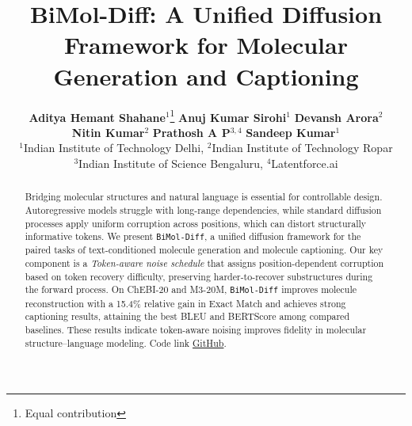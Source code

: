\documentclass[11pt]{article}
\title{BiMol-Diff: A Unified Diffusion Framework for Molecular Generation and Captioning}
\author{
\textbf{Aditya Hemant Shahane}$^{1}$\thanks{Equal contribution} \quad
\textbf{Anuj Kumar Sirohi}$^{1}$\footnotemark[1] \quad
\textbf{Devansh Arora}$^{2}$ \\
\textbf{Nitin Kumar}$^{2}$ \quad
\textbf{Prathosh A P}$^{3,4}$ \quad
\textbf{Sandeep Kumar}$^{1}$ \\
$^{1}$Indian Institute of Technology Delhi, 
$^{2}$Indian Institute of Technology Ropar \\
$^{3}$Indian Institute of Science Bengaluru, 
$^{4}$Latentforce.ai
}
\begin{document}
\maketitle
\begin{abstract}

Bridging molecular structures and natural language is essential for controllable design. Autoregressive models struggle with long-range dependencies, while standard diffusion processes apply uniform corruption across positions, which can distort structurally informative tokens. We present \texttt{BiMol-Diff}, a unified diffusion framework for the paired tasks of text-conditioned molecule generation and molecule captioning. Our key component is a \textit{Token-aware noise schedule} that assigns position-dependent corruption based on token recovery difficulty, preserving harder-to-recover substructures during the forward process. On ChEBI-20 and M3-20M, \texttt{BiMol-Diff} improves molecule reconstruction with a 15.4\% relative gain in Exact Match and achieves strong captioning results, attaining the best BLEU and BERTScore among compared baselines. These results indicate token-aware noising improves fidelity in molecular structure--language modeling.
Code link \href{https://github.com/adityashahane10/BiMol-Diff-Unified-Diffusion-Framework-for-Molecular-Generation-and-Captioning.git}{GitHub}.

\end{abstract}







\appendix

\end{document}
